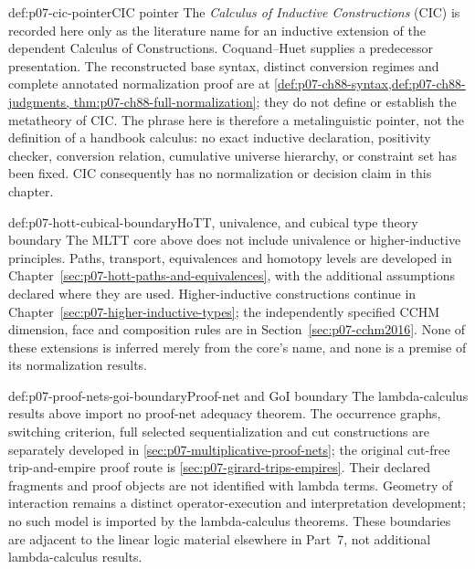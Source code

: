 \begin{proofboundary}{def:p07-cic-pointer}{CIC pointer}
The \emph{Calculus of Inductive Constructions} (CIC) is recorded here only as
the literature name for an inductive extension of the dependent Calculus of
Constructions. Coquand--Huet \cite{CoquandHuet1988} supplies a predecessor
presentation. The reconstructed base syntax, distinct conversion regimes
and complete annotated normalization proof are at
\cref{def:p07-ch88-syntax,def:p07-ch88-judgments,
thm:p07-ch88-full-normalization}; they do not define or establish the
metatheory of CIC. The phrase here is therefore a
metalinguistic pointer, not the definition of a handbook calculus: no exact
inductive declaration, positivity checker, conversion relation, cumulative
universe hierarchy, or constraint set has been fixed.  CIC consequently has
no normalization or decision claim in this chapter.
\end{proofboundary}

\begin{proofboundary}{def:p07-hott-cubical-boundary}{HoTT, univalence, and cubical type theory boundary}
The MLTT core above does not include univalence or higher-inductive
principles. Paths, transport, equivalences and homotopy levels are developed
in Chapter~\ref{sec:p07-hott-paths-and-equivalences}, with the additional
assumptions declared where they are used. Higher-inductive constructions
continue in Chapter~\ref{sec:p07-higher-inductive-types}; the independently
specified CCHM dimension, face and composition rules are in
Section~\ref{sec:p07-cchm2016}. None of these extensions is inferred merely
from the core's name, and none is a premise of its normalization results.
\end{proofboundary}

\begin{proofboundary}{def:p07-proof-nets-goi-boundary}{Proof-net and GoI boundary}
The lambda-calculus results above import no proof-net adequacy theorem.
The occurrence graphs, switching criterion, full selected sequentialization
and cut constructions are separately developed in
\cref{sec:p07-multiplicative-proof-nets}; the original cut-free
trip-and-empire proof route is
\cref{sec:p07-girard-trips-empires}. Their declared fragments and proof
objects are not identified with lambda terms. Geometry of interaction
remains a distinct operator-execution and interpretation development;
no such model is imported by the lambda-calculus theorems.
These boundaries are adjacent to the linear
logic material elsewhere in Part~7, not additional lambda-calculus results.
\end{proofboundary}

